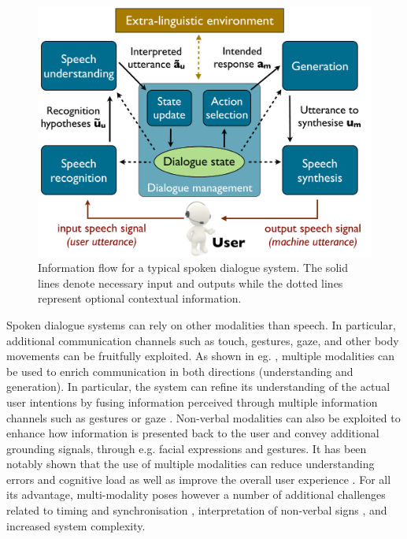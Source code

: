  \begin{figure}[h]
\centering
\includegraphics[scale=0.32]{imgs/architecture.pdf}
\caption{Information flow for a typical spoken dialogue system. The solid lines denote necessary input and outputs while the dotted lines represent optional contextual information.}
\label{fig:architecture}
\end{figure}

Spoken dialogue systems can rely on other modalities than speech.  In particular, additional communication channels such as touch, gestures, gaze, and other body movements can be fruitfully exploited.  As shown in eg. \cite{smartkom}, multiple modalities can be used to enrich communication in both directions (understanding and generation). In particular, the system can refine its understanding of the actual user intentions by fusing information perceived through multiple information channels such as gestures \citep{stiefelhagen2004} or gaze \citep{koller2012}.  Non-verbal modalities can also be exploited to enhance how information is presented back to the user and convey additional grounding signals, through e.g. facial expressions and gestures. It has been notably shown that the use of multiple modalities can reduce understanding errors and cognitive load \citep{oviatt2004we} as well as improve the overall user experience   \citep{JokinenH06}.  For all its advantage, multi-modality poses however a number of additional challenges related to timing and synchronisation \citep{DBLP:conf/hri/SalemKJ13}, interpretation of non-verbal signs \citep{cassell2007trading}, and increased system complexity. 

